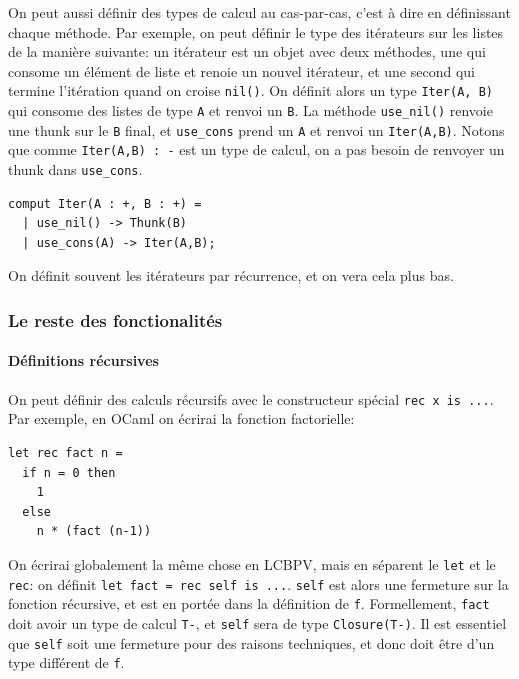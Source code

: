 \documentclass[12pt]{article}
\begin{document}
On peut aussi définir des types de calcul au cas-par-cas, c'est à dire
en définissant chaque méthode. Par exemple, on peut définir le type des
itérateurs sur les listes de la manière suivante: un itérateur est un
objet avec deux méthodes, une qui consome un élément de liste et renoie
un nouvel itérateur, et une second qui termine l'itération quand on
croise \texttt{nil()}. On définit alors un type \texttt{Iter(A,\ B)} qui
consome des listes de type \texttt{A} et renvoi un \texttt{B}. La
méthode \texttt{use\_nil()} renvoie une thunk sur le \texttt{B} final,
et \texttt{use\_cons} prend un \texttt{A} et renvoi un
\texttt{Iter(A,B)}. Notons que comme \texttt{Iter(A,B)\ :\ -} est un
type de calcul, on a pas besoin de renvoyer un thunk dans
\texttt{use\_cons}.

\begin{verbatim}
comput Iter(A : +, B : +) =
  | use_nil() -> Thunk(B)
  | use_cons(A) -> Iter(A,B);
\end{verbatim}

On définit souvent les itérateurs par récurrence, et on vera cela plus
bas.

\hypertarget{le-reste-des-fonctionalituxe9s}{%
      \subsubsection*{Le reste des
            fonctionalités}\label{le-reste-des-fonctionalituxe9s}}

\hypertarget{duxe9finitions-ruxe9cursives}{%
      \paragraph*{Définitions
            récursives}\label{duxe9finitions-ruxe9cursives}}

On peut définir des calculs récursifs avec le constructeur spécial
\texttt{rec\ x\ is\ ...}. Par exemple, en OCaml on écrirai la fonction
factorielle:

\begin{verbatim}
let rec fact n = 
  if n = 0 then
    1 
  else 
    n * (fact (n-1))
\end{verbatim}

On écrirai globalement la même chose en LCBPV, mais en séparent le
\texttt{let} et le \texttt{rec}: on définit
\texttt{let\ fact\ =\ rec\ self\ is\ ...}. \texttt{self} est alors une
fermeture sur la fonction récursive, et est en portée dans la définition
de \texttt{f}. Formellement, \texttt{fact} doit avoir un type de calcul
\texttt{T-}, et \texttt{self} sera de type \texttt{Closure(T-)}. Il est
essentiel que \texttt{self} soit une fermeture pour des raisons
techniques, et donc doit être d'un type différent de \texttt{f}.
\end{document}
